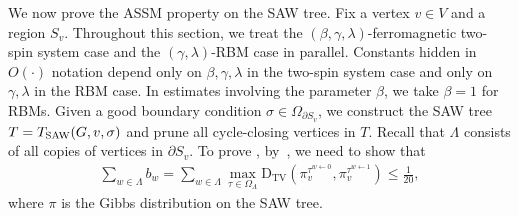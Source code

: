 \documentclass[11pt]{amsart}
\def\-#1{\mathrm{#1}}
\newcommand{\DTV}[2]{\-D_{\mathrm{TV}}\left({#1},{#2}\right)}
\theoremstyle{definition}
\theoremstyle{remark}
\begin{document}
We now prove the ASSM property on the SAW tree. Fix a vertex $v \in V$ and a region $S_v$.
Throughout this section, we treat the $(\beta,\gamma,\lambda)$-ferromagnetic two-spin system case and the $(\gamma,\lambda)$-RBM case in parallel. Constants hidden in $O(\cdot)$ notation depend only on $\beta,\gamma,\lambda$ in the two-spin system case and only on $\gamma,\lambda$ in the RBM case. In estimates involving the parameter $\beta$, we take $\beta=1$ for RBMs.
Given a good boundary condition $\sigma \in \Omega_{\partial S_v}$, we construct the SAW tree $T = T_{\textnormal{SAW}}(G,v,\sigma)$ and prune all cycle-closing vertices in $T$. Recall that $\Lambda$ consists of all copies of vertices in $\partial S_v$.
To prove , by~, we need to show that
\begin{align*}
    \sum_{w\in \Lambda} b_w = \sum_{w \in \Lambda} \max_{\tau \in \Omega_{\Lambda}} \DTV{\pi^{\tau^{w \gets 0}}_v}{\pi^{\tau^{w \gets 1}}_v}  \leq \frac{1}{20},
\end{align*}
where $\pi$ is the Gibbs distribution on the SAW tree.
\end{document}
